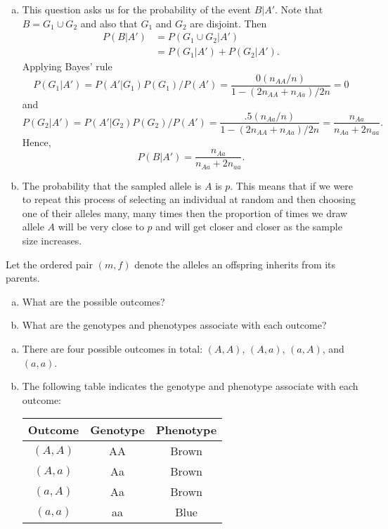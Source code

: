\documentclass[addpoints,answers]{exam}
\begin{document}
\begin{questions}
\begin{solution}
\begin{enumerate}[a)]
  \item This question asks us for the probability of the event $B|A'$. Note that $B=G_1 \cup G_2$ and also that $G_1$ and $G_2$ are disjoint. Then
  $$
  \begin{aligned}
  P(B|A')
  &=P(G_1 \cup G_2|A')\\
  &=P(G_1|A') + P(G_2|A').
  \end{aligned}
  $$
  Applying Bayes' rule
  $$
  P(G_1|A')=P(A'|G_1)P(G_1)/P(A')=\frac{0(n_{AA}/n)}{1-(2n_{AA} + n_{Aa})/2n}=0
  $$
  and
  $$
  P(G_2|A')=P(A'|G_2)P(G_2)/P(A')=\frac{.5(n_{Aa}/n)}{1-(2n_{AA} + n_{Aa})/2n}=\frac{n_{Aa}}{n_{Aa}+2 n_{aa}}.
  $$
  Hence, 
  $$
  P(B|A')=\frac{n_{Aa}}{n_{Aa}+2 n_{aa}}.
  $$
  \item The probability that the sampled allele is $A$ is $p$. This means that if we were to repeat this process of selecting an individual at random and then choosing one of their alleles many, many times then the proportion of times we draw allele $A$ will be very close to $p$ and will get closer and closer as the sample size increases. 
  \end{enumerate}
  \end{solution}
    
    \question
    Let the ordered pair $(m,f)$ denote the alleles an offspring inherits from its parents. 
  
  \begin{enumerate}[a)]
  \item What are the possible outcomes?
  \item What are the genotypes and phenotypes associate with each outcome?
  \end{enumerate}
  
    \begin{solution}
    \begin{enumerate}[a)]
    \item There are four possible outcomes in total: $(A,A)$, $(A,a)$, $(a,A)$, and $(a,a)$.
    \item The following table indicates the genotype and phenotype associate with each outcome:
    \begin{center}
    \begin{tabular}{ccc}
    Outcome & Genotype & Phenotype\\
    \hline
    $(A,A)$ & AA & Brown\\
    $(A,a)$ & Aa & Brown\\
    $(a,A)$ & Aa & Brown\\
    $(a,a)$ & aa & Blue
    \end{tabular}
    \end{center}
    \end{enumerate}
    \end{solution}
    

\end{questions}
\end{document}
